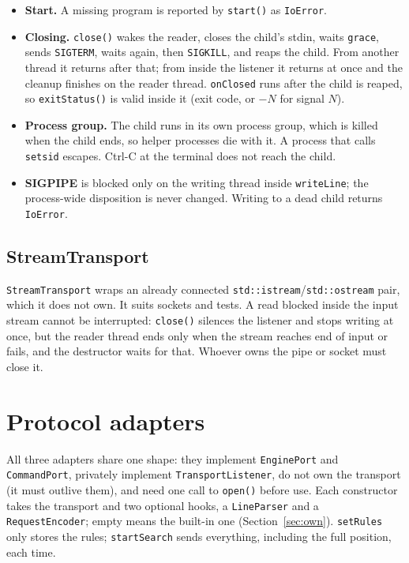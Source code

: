 \documentclass[11pt,a4paper]{article}
\newcommand{\code}[1]{\texttt{#1}}
\begin{document}
\begin{itemize}
  \item \textbf{Start.} A missing program is reported by \code{start()} as \code{IoError}.
  \item \textbf{Closing.} \code{close()} wakes the reader, closes the child's stdin, waits
        \code{grace}, sends \code{SIGTERM}, waits again, then \code{SIGKILL}, and reaps the child.
        From another thread it returns after that; from inside the listener it returns at once and
        the cleanup finishes on the reader thread. \code{onClosed} runs after the child is reaped,
        so \code{exitStatus()} is valid inside it (exit code, or $-N$ for signal $N$).
  \item \textbf{Process group.} The child runs in its own process group, which is killed when the
        child ends, so helper processes die with it. A process that calls \code{setsid} escapes.
        Ctrl-C at the terminal does not reach the child.
  \item \textbf{SIGPIPE} is blocked only on the writing thread inside \code{writeLine}; the
        process-wide disposition is never changed. Writing to a dead child returns \code{IoError}.
\end{itemize}

\subsection{StreamTransport}

\code{StreamTransport} wraps an already connected \code{std::istream}/\code{std::ostream} pair,
which it does not own. It suits sockets and tests. A read blocked inside the input stream cannot
be interrupted: \code{close()}
silences the listener and stops writing at once, but the reader thread ends only when the stream
reaches end of input or fails, and the destructor waits for that. Whoever owns the pipe or socket
must close it.

\section{Protocol adapters}

All three adapters share one shape: they implement \code{EnginePort} and \code{CommandPort},
privately implement \code{TransportListener}, do not own the transport (it must outlive them),
and need one call to \code{open()} before use. Each constructor takes the transport and two
optional hooks, a \code{LineParser} and a \code{RequestEncoder}; empty means the built-in one
(Section~\ref{sec:own}). \code{setRules} only stores the rules; \code{startSearch} sends
everything, including the full position, each time.
\end{document}

